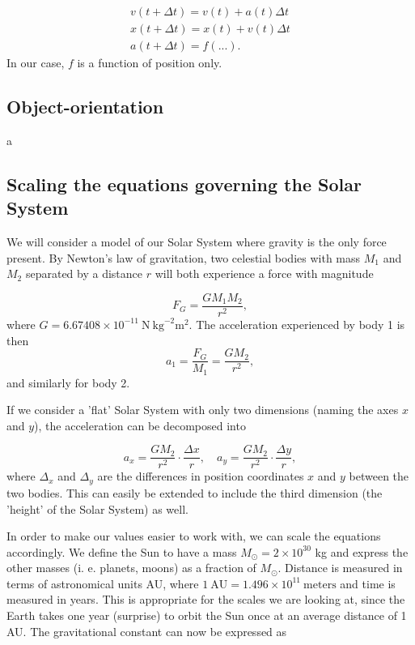 \documentclass{emulateapj}
\begin{document}
\begin{gather}
    v(t + \Delta t) = v(t) + a(t) \Delta t \\
    x(t + \Delta t) = x(t) + v(t) \Delta t \\
    a(t + \Delta t) = f( ... ).
\end{gather}
In our case, $f$ is a function of position only. 


\subsection{Object-orientation}
a

\subsection{Scaling the equations governing the Solar System}
We will consider a model of our Solar System where gravity is the only force present. By Newton's law of gravitation, two celestial bodies with mass $M_1$ and $M_2$ separated by a distance $r$ will both experience a force with magnitude

\begin{equation}\label{eq:gforce}
    F_G = \frac{G M_1 M_2}{r^2},
\end{equation}
where $G = 6.67408 \times 10^{-11} \ \textrm{N} \ \textrm{kg}^{-2} \textrm{m}^2$. The acceleration experienced by body 1 is then
\begin{equation}
    a_1 = \frac{F_G}{M_1} = \frac{G M_2}{r^2},
\end{equation}
and similarly for body 2.

If we consider a 'flat' Solar System with only two dimensions (naming the axes $x$ and $y$), the acceleration can be decomposed into

\begin{equation}
    a_x = \frac{G M_2}{r^2}\cdot\frac{\Delta x}{r}, \quad a_y = \frac{G M_2}{r^2}\cdot\frac{\Delta y}{r},
\end{equation}
where $\Delta_x$ and $\Delta_y$ are the differences in position coordinates $x$ and $y$ between the two bodies. This can easily be extended to include the third dimension (the 'height' of the Solar System) as well. 

In order to make our values easier to work with, we can scale the equations accordingly. We define the Sun to have a mass $M_\odot = 2\times 10^{30}$ kg and express the other masses (i. e. planets, moons) as a fraction of $M_\odot$. Distance is measured in terms of astronomical units AU, where $1 \ \textrm{AU} = 1.496 \times 10^{11} \ \textrm{meters}$ and time is measured in years. This is appropriate for the scales we are looking at, since the Earth takes one year (surprise) to orbit the Sun once at an average distance of 1 AU. The gravitational constant can now be expressed as 
\end{document}
